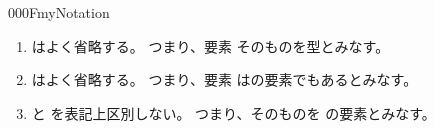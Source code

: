 \documentclass[index]{subfiles}
\begin{document}
\begin{myBlock}{000F}{myNotation}
  \begin{enumerate}
  \item {}はよく省略する。
    つまり、要素
    そのものを型とみなす。
  \item {}はよく省略する。
    つまり、要素
    はの要素でもあるとみなす。
  \item {}と
    を表記上区別しない。
    つまり、そのものを
    の要素とみなす。
  \end{enumerate}
\end{myBlock}
\end{document}
